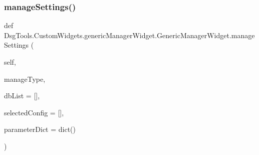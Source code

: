 \subsubsection{\texorpdfstring{manage\+Settings()}{manageSettings()}}
{\footnotesize\ttfamily def Dsg\+Tools.\+Custom\+Widgets.\+generic\+Manager\+Widget.\+Generic\+Manager\+Widget.\+manage\+Settings (\begin{DoxyParamCaption}\item[{}]{self,  }\item[{}]{manage\+Type,  }\item[{}]{db\+List = {\ttfamily \mbox{[}\mbox{]}},  }\item[{}]{selected\+Config = {\ttfamily \mbox{[}\mbox{]}},  }\item[{}]{parameter\+Dict = {\ttfamily dict()} }\end{DoxyParamCaption})}

